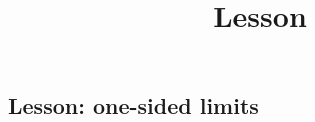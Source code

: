 \documentclass{ximera}
\title{Lesson}
\begin{document}
\begin{abstract}
\end{abstract}

\maketitle

\subsection{Lesson: one-sided limits}

\begin{center}
\end{center}
\end{document}
